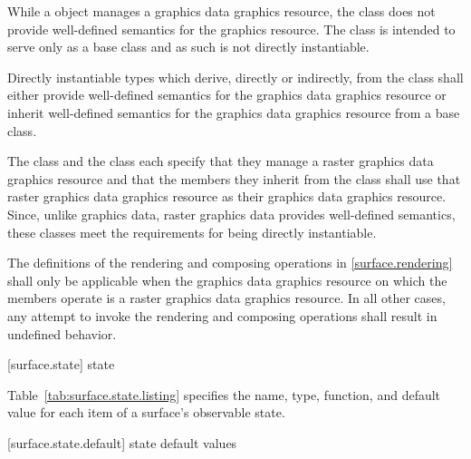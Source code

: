 \pnum
\enternote
While a  object manages a graphics data graphics resource, the  class does not provide well-defined semantics for the graphics resource. The  class is intended to serve only as a base class and as such is not directly instantiable.
\exitnote

\pnum
Directly instantiable types which derive, directly or indirectly, from the  class shall either provide well-defined semantics for the graphics data graphics resource or inherit well-defined semantics for the graphics data graphics resource from a base class.

\pnum
\enterexample
The  class and the  class each specify that they manage a raster graphics data graphics resource and that the members they inherit from the  class shall use that raster graphics data graphics resource as their graphics data graphics resource. Since, unlike graphics data, raster graphics data provides well-defined semantics, these classes meet the requirements for being directly instantiable.
\exitexample

\pnum
The definitions of the rendering and composing operations in \ref{surface.rendering} shall only be applicable when the graphics data graphics resource on which the  members operate is a raster graphics data graphics resource. In all other cases, any attempt to invoke the rendering and composing operations shall result in undefined behavior.

 [surface.state] { state}

\pnum
Table~\ref{tab:surface.state.listing} specifies the name, type, function, and default value for each item of a surface's observable state.

 [surface.state.default] { state default values}

